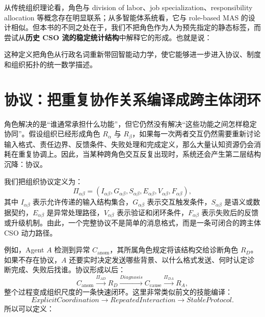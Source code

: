 从传统组织理论看，角色与 division of labor、job specialization、responsibility allocation 等概念存在明显联系；从多智能体系统看，它与 role-based MAS 的设计相似。但本书的不同之处在于，我们不把角色作为人为预先指定的静态标签，而尝试从\textbf{历史 CSO 流的稳定统计结构}中解释它的形成。也就是说：
\begin{statementbox}
\centering
{}
\end{statementbox}
这种定义把角色从行政名词重新带回智能动力学，使它能够进一步进入协议、制度和组织拓扑的统一数学描述。


\section{协议：把重复协作关系编译成跨主体闭环}
\label{sec:organizational-protocol}

角色解决的是“谁通常承担什么功能”，但它仍然没有解决“这些功能之间怎样稳定协同”。假设组织已经形成角色 $R_\alpha$ 与 $R_\beta$，如果每一次两者交互仍然需要重新讨论输入格式、责任边界、反馈条件、失败处理和完成定义，那么大量认知资源仍会消耗在重复协调上。因此，当某种跨角色交互反复出现时，系统还会产生第二层结构沉降：协议。

我们把组织协议定义为：
\[
\Pi_{\alpha\beta}
=
\left(
I_{\alpha\beta},
G_{\alpha\beta},
S_{\alpha\beta},
E_{\alpha\beta},
V_{\alpha\beta},
F_{\alpha\beta}
\right),
\]
其中 $I_{\alpha\beta}$ 表示允许传递的输入结构集合，$G_{\alpha\beta}$ 表示交互触发条件，$S_{\alpha\beta}$ 是语义或数据契约，$E_{\alpha\beta}$ 是异常处理路径，$V_{\alpha\beta}$ 表示验证和闭环条件，$F_{\alpha\beta}$ 表示失败后的反馈或升级机制。由此，一个完整协议不是简单的消息格式，而是一条可闭合的跨主体 CSO 动力路径。

例如，Agent $A$ 检测到异常 $C_{\mathrm{anom}}$，其所属角色规定将该结构交给诊断角色 $R_D$。如果不存在协议，$A$ 还要实时决定发送哪些背景、以什么格式发送、何时认定诊断完成、失败后找谁。协议形成以后：
\[
C_{\mathrm{anom}}
\xrightarrow{\Pi_{AD}}
R_D
\xrightarrow{Diagnosis}
C_{\mathrm{cause}}
\xrightarrow{\Pi_{DA}}
R_A,
\]
整个过程变成组织尺度的一条快速闭环。这里非常类似前文的技能编译：
\[
ExplicitCoordination
\rightarrow
RepeatedInteraction
\rightarrow
StableProtocol.
\]
所以可以定义：
\begin{statementbox}
\centering
{}
\end{statementbox}

